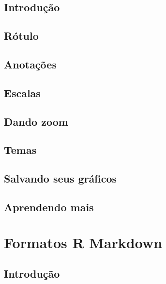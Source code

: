 \documentclass[
]{latex/krantz}
\theoremstyle{definition}
\theoremstyle{definition}
\theoremstyle{definition}
\theoremstyle{definition}
\theoremstyle{remark}
\begin{document}
\hypertarget{introduuxe7uxe3o-18}{%
\section{Introdução}\label{introduuxe7uxe3o-18}}

\hypertarget{ruxf3tulo}{%
\section{Rótulo}\label{ruxf3tulo}}

\hypertarget{anotauxe7uxf5es}{%
\section{Anotações}\label{anotauxe7uxf5es}}

\hypertarget{escalas}{%
\section{Escalas}\label{escalas}}

\hypertarget{dando-zoom}{%
\section{Dando zoom}\label{dando-zoom}}

\hypertarget{temas}{%
\section{Temas}\label{temas}}

\hypertarget{salvando-seus-gruxe1ficos}{%
\section{Salvando seus gráficos}\label{salvando-seus-gruxe1ficos}}

\hypertarget{aprendendo-mais-2}{%
\section{Aprendendo mais}\label{aprendendo-mais-2}}

\hypertarget{formatos-r-markdown}{%
\chapter{Formatos R Markdown}\label{formatos-r-markdown}}

\hypertarget{introduuxe7uxe3o-19}{%
\section{Introdução}\label{introduuxe7uxe3o-19}}
\end{document}
